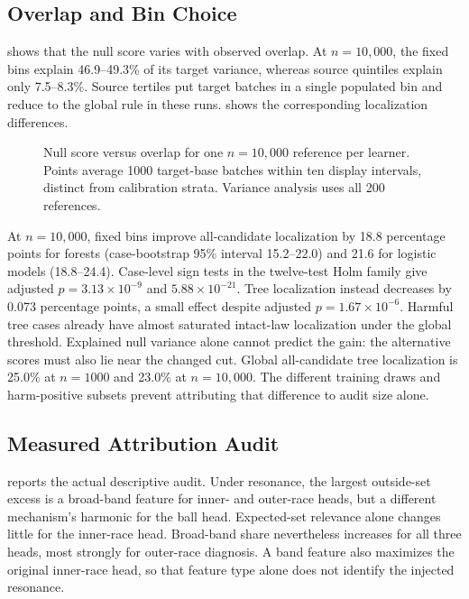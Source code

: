 \documentclass[conference]{IEEEtran}
\begin{document}
\subsection{Overlap and Bin Choice}
 shows that the null score varies with observed overlap. At $n=10{,}000$, the fixed bins explain 46.9--49.3\% of its target variance, whereas source quintiles explain only 7.5--8.3\%. Source tertiles put target batches in a single populated bin and reduce to the global rule in these runs.  shows the corresponding localization differences.

\begin{figure}[t]
\centering

\caption{Null score versus overlap for one $n=10{,}000$ reference per learner. Points average 1000 target-base batches within ten display intervals, distinct from calibration strata. Variance analysis uses all 200 references.}
\label{fig:overlap-score}
\end{figure}

\begin{table}[t]
\centering
\caption{Bin sensitivity at $n=10{,}000$: target null variance explained by fixed bins and intact-law localization (\%) over 200 candidates. Source thirds/fifths use source-only edges; residual calibration is independent.}
\label{tab:transfer-bins}
\footnotesize

\end{table}

At $n=10{,}000$, fixed bins improve all-candidate localization by 18.8 percentage points for forests (case-bootstrap 95\% interval 15.2--22.0) and 21.6 for logistic models (18.8--24.4). Case-level sign tests in the twelve-test Holm family give adjusted $p=3.13\times10^{-9}$ and $5.88\times10^{-21}$. Tree localization instead decreases by 0.073 percentage points, a small effect despite adjusted $p=1.67\times10^{-6}$. Harmful tree cases already have almost saturated intact-law localization under the global threshold. Explained null variance alone cannot predict the gain: the alternative scores must also lie near the changed cut. Global all-candidate tree localization is 25.0\% at $n=1000$ and 23.0\% at $n=10{,}000$. The different training draws and harm-positive subsets prevent attributing that difference to audit size alone.

\subsection{Measured Attribution Audit}
 reports the actual descriptive audit. Under resonance, the largest outside-set excess is a broad-band feature for inner- and outer-race heads, but a different mechanism's harmonic for the ball head. Expected-set relevance alone changes little for the inner-race head. Broad-band share nevertheless increases for all three heads, most strongly for outer-race diagnosis. A band feature also maximizes the original inner-race head, so that feature type alone does not identify the injected resonance.
\end{document}
